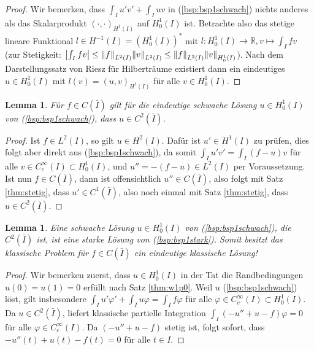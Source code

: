 \documentclass[twoside]{article}
\newtheorem{lemma}[theorem]{Lemma}
\theoremstyle{definition}
\begin{document}
\begin{proof}
Wir bemerken, dass $\int_I u'v' + \int_I uv$ in (\ref{bsp:bsp1schwach}) nichts anderes als das Skalarprodukt $(\cdot,\cdot)_{H^1(I)}$ auf $H^1_0(I)$ ist. Betrachte also das stetige lineare Funktional $l \in H^{-1}(I) = \left(H^1_0(I) \right)^* $ mit $l:H^1_0(I) \to \mathbb{R}, v \mapsto \int_I fv$ (zur Stetigkeit: $\abs{\int_I fv} \leq \norm{f}_{L^2(I)} \norm{v}_{L^2(I)} \leq \norm{f}_{L^2(I)} \norm{v}_{H^1_0(I)}$). Nach dem Darstellungssatz von Riesz für Hilberträume existiert dann ein eindeutiges $u \in H^1_0(I)$ mit $l(v) = (u,v)_{H^1(I)}$ für alle $v \in H^1_0(I)$.
\end{proof}
\begin{lemma}
Für $f \in C(\bar{I})$ gilt für die eindeutige schwache Lösung $u \in H_0^1(I)$ von (\ref{bsp:bsp1schwach}), dass $u \in C^2(\bar{I})$.
\end{lemma}
\begin{proof}
Ist $f \in L^2(I)$, so gilt $u \in H^2(I)$. Dafür ist $u' \in H^1(I)$ zu prüfen, dies folgt aber direkt aus (\ref{bsp:bsp1schwach}), da somit $\int_I u' v' = \int_I (f-u) v$ für alle $v \in C_c^\infty(I) \subset H_0^1(I)$, und $u'' = -(f-u) \in L^2(I)$ per Voraussetzung. Ist nun $f \in C(\bar{I})$, dann ist offensichtlich $u'' \in C(\bar{I})$, also folgt mit Satz \ref{thm:stetig}, dass $u' \in C^1(\bar{I})$, also noch einmal mit Satz \ref{thm:stetig}, dass $u \in C^2(\bar{I})$.
\end{proof}
\begin{lemma} \label{lemma:schwachstark}
Eine schwache Lösung $u \in H^1_0(I)$ von (\ref{bsp:bsp1schwach}), die $C^2(\bar{I})$ ist, ist eine starke Lösung von (\ref{bsp:bsp1stark}). Somit besitzt das klassische Problem für $f \in C(\bar{I})$ ein eindeutige klassische Lösung!
\end{lemma}
\begin{proof}
Wir bemerken zuerst, dass $u \in H^1_0(I)$ in der Tat die Randbedingungen $u(0)=u(1)=0$ erfüllt nach Satz \ref{thm:w1p0}. Weil $u$  (\ref{bsp:bsp1schwach}) löst, gilt insbesondere $\int_I u'\varphi' + \int_I u\varphi = \int_I f\varphi$ für alle $\varphi \in C_c^\infty(I) \subset H^1_0(I)$. Da $u \in C^2(\bar{I})$, liefert klassische partielle Integration $\int_I (-u'' + u - f) \varphi= 0$ für alle $\varphi \in C_c^\infty(I)$. Da $(-u'' + u - f)$ stetig ist, folgt sofort, dass $-u''(t) + u(t) - f(t)=0$ für alle $t \in I$.
\end{proof}
\end{document}
